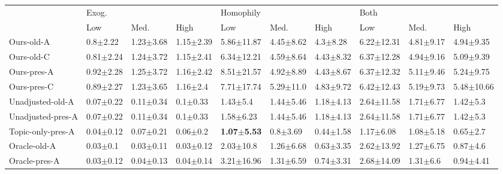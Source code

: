 \begin{tabular}{llllllllll}
\toprule
{} & \multicolumn{3}{l}{Exog.} & \multicolumn{3}{l}{Homophily} & \multicolumn{3}{l}{Both} \\
{} &            Low &           Med. &           High &                     Low &                  Med. &                  High &             Low &           Med. &            High \\
\midrule
Ours-old-A          &   0.8$\pm$2.22 &  1.23$\pm$3.68 &  1.15$\pm$2.39 &          5.86$\pm$11.87 &         4.45$\pm$8.62 &          4.3$\pm$8.28 &  6.22$\pm$12.31 &  4.81$\pm$9.17 &   4.94$\pm$9.35 \\
Ours-old-C          &  0.81$\pm$2.24 &  1.24$\pm$3.72 &  1.15$\pm$2.41 &          6.34$\pm$12.21 &         4.59$\pm$8.64 &         4.43$\pm$8.32 &  6.37$\pm$12.28 &  4.94$\pm$9.16 &   5.09$\pm$9.39 \\
Ours-pres-A         &  0.92$\pm$2.28 &  1.25$\pm$3.72 &  1.16$\pm$2.42 &          8.51$\pm$21.57 &         4.92$\pm$8.89 &         4.43$\pm$8.67 &  6.37$\pm$12.32 &  5.11$\pm$9.46 &   5.24$\pm$9.75 \\
Ours-pres-C         &  0.89$\pm$2.27 &  1.23$\pm$3.65 &   1.16$\pm$2.4 &          7.71$\pm$17.74 &         5.29$\pm$11.0 &         4.83$\pm$9.72 &  6.42$\pm$12.43 &  5.19$\pm$9.73 &  5.48$\pm$10.66 \\
Unadjusted-old-A    &  0.07$\pm$0.22 &  0.11$\pm$0.34 &   0.1$\pm$0.33 &            1.43$\pm$5.4 &         1.44$\pm$5.46 &         1.18$\pm$4.13 &  2.64$\pm$11.58 &  1.71$\pm$6.77 &    1.42$\pm$5.3 \\
Unadjusted-pres-A   &  0.07$\pm$0.22 &  0.11$\pm$0.34 &   0.1$\pm$0.33 &           1.58$\pm$6.23 &         1.44$\pm$5.46 &         1.18$\pm$4.13 &  2.64$\pm$11.58 &  1.71$\pm$6.77 &    1.42$\pm$5.3 \\
Topic-only-pres-A   &  0.04$\pm$0.12 &  0.07$\pm$0.21 &   0.06$\pm$0.2 &  \textbf{1.07$\pm$5.53} &          0.8$\pm$3.69 &         0.44$\pm$1.58 &   1.17$\pm$6.08 &  1.08$\pm$5.18 &    0.65$\pm$2.7 \\
Oracle-old-A        &   0.03$\pm$0.1 &  0.03$\pm$0.11 &  0.03$\pm$0.12 &           2.03$\pm$10.8 &         1.26$\pm$6.68 &         0.63$\pm$3.35 &  2.62$\pm$13.92 &  1.27$\pm$6.75 &    0.87$\pm$4.6 \\
Oracle-pres-A       &  0.03$\pm$0.12 &  0.04$\pm$0.13 &  0.04$\pm$0.14 &          3.21$\pm$16.96 &         1.31$\pm$6.59 &         0.74$\pm$3.31 &  2.68$\pm$14.09 &   1.31$\pm$6.6 &   0.94$\pm$4.41 \\

\end{tabular}
